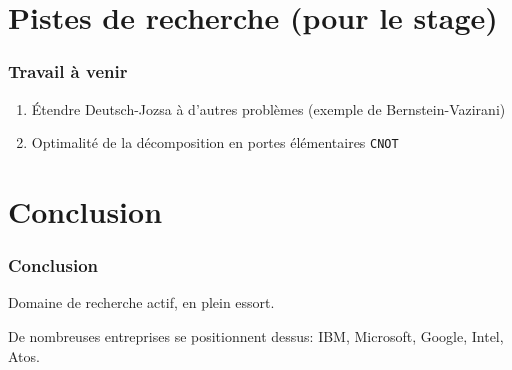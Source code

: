 \documentclass{beamer}
\begin{document}
\section{Pistes de recherche (pour le stage)}
\begin{frame}
  \frametitle{Travail à venir}

  \begin{enumerate}
    \item \'Etendre Deutsch-Jozsa à d'autres problèmes (exemple de Bernstein-Vazirani)
    \item Optimalité de la décomposition en portes élémentaires \texttt{CNOT}
  \end{enumerate}

\end{frame}

\section{Conclusion}
\begin{frame}
\frametitle{Conclusion}

Domaine de recherche actif, en plein essort.

\medbreak

De nombreuses entreprises se positionnent dessus: IBM, Microsoft, Google, Intel, Atos.

\end{frame}
\end{document}
